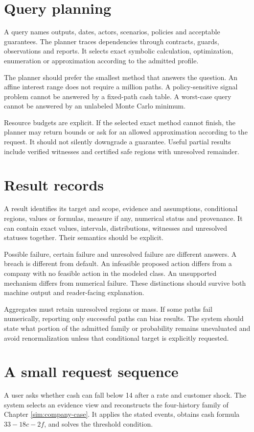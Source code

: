 \section{Query planning}
A query names outputs, dates, actors, scenarios, policies and acceptable guarantees. The planner traces dependencies through contracts, guards, observations and reports. It selects exact symbolic calculation, optimization, enumeration or approximation according to the admitted profile.

The planner should prefer the smallest method that answers the question. An affine interest range does not require a million paths. A policy-sensitive signal problem cannot be answered by a fixed-path cash table. A worst-case query cannot be answered by an unlabeled Monte Carlo minimum.

Resource budgets are explicit. If the selected exact method cannot finish, the planner may return bounds or ask for an allowed approximation according to the request. It should not silently downgrade a guarantee. Useful partial results include verified witnesses and certified safe regions with unresolved remainder.

\section{Result records}
A result identifies its target and scope, evidence and assumptions, conditional regions, values or formulas, measure if any, numerical status and provenance. It can contain exact values, intervals, distributions, witnesses and unresolved statuses together. Their semantics should be explicit.

Possible failure, certain failure and unresolved failure are different answers. A breach is different from default. An infeasible proposed action differs from a company with no feasible action in the modeled class. An unsupported mechanism differs from numerical failure. These distinctions should survive both machine output and reader-facing explanation.

Aggregates must retain unresolved regions or mass. If some paths fail numerically, reporting only successful paths can bias results. The system should state what portion of the admitted family or probability remains unevaluated and avoid renormalization unless that conditional target is explicitly requested.

\section{A small request sequence}
A user asks whether cash can fall below 14 after a rate and customer shock. The system selects an evidence view and reconstructs the four-history family of Chapter \ref{sim:company-case}. It applies the stated events, obtains cash formula $33-18c-2f$, and solves the threshold condition.

